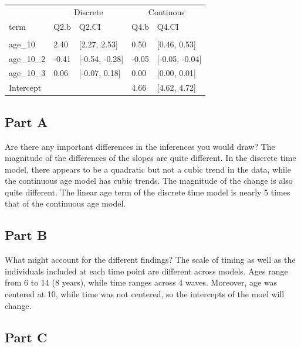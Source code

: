 \documentclass[]{article}
\begin{document}
\begin{table}[H]
\centering
\begin{tabular}{lllll}
\toprule
\multicolumn{1}{c}{ } & \multicolumn{2}{c}{Discrete} & \multicolumn{2}{c}{Continous} \\
\cmidrule(l{2pt}r{2pt}){2-3} \cmidrule(l{2pt}r{2pt}){4-5}
term & Q2.b & Q2.CI & Q4.b & Q4.CI\\
\midrule
\addlinespace[0.3em]
\multicolumn{5}{l}{\textbf{Fixed}}\\
\hspace{1em}age\_10 & 2.40 & [2.27, 2.53] & 0.50 & [0.46, 0.53]\\
\hspace{1em}age\_10\_2 & -0.41 & [-0.54, -0.28] & -0.05 & [-0.05, -0.04]\\
\hspace{1em}age\_10\_3 & 0.06 & [-0.07, 0.18] & 0.00 & [0.00, 0.01]\\
\hspace{1em}Intercept &  &  & 4.66 & [4.62, 4.72]\\
\bottomrule
\end{tabular}
\end{table}

\subsection{Part A}\label{part-a-2}

Are there any important differences in the inferences you would draw?
The magnitude of the differences of the slopes are quite different. In
the discrete time model, there appears to be a quadratic but not a cubic
trend in the data, while the continuous age model has cubic trends. The
magnitude of the change is also quite different. The linear age term of
the discrete time model is nearly 5 times that of the continuous age
model.

\subsection{Part B}\label{part-b-2}

What might account for the different findings? The scale of timing as
well as the individuals included at each time point are different across
models. Ages range from 6 to 14 (8 years), while time ranges across 4
waves. Moreover, age was centered at 10, while time was not centered, so
the intercepts of the moel will change.

\subsection{Part C}\label{part-c-1}
\end{document}
